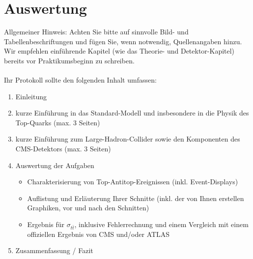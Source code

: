 \section{Auswertung}
\label{prot}
Allgemeiner Hinweis: Achten Sie bitte auf sinnvolle Bild- und Tabellenbeschriftungen und f\"ugen Sie, wenn notwendig, Quellenangaben hinzu. Wir empfehlen einf\"uhrende Kapitel (wie das Theorie- und Detektor-Kapitel) bereits vor Praktikumsbeginn zu schreiben.\\
\\
Ihr Protokoll sollte den folgenden Inhalt umfassen:
\begin{enumerate}
	\item Einleitung
	\item kurze Einf\"uhrung in das Standard-Modell und insbesondere in die Physik des Top-Quarks (max. 3 Seiten)
	\item kurze Einf\"uhrung zum Large-Hadron-Collider sowie den Komponenten des CMS-Detektors (max. 3 Seiten)
	\item Auswertung der Aufgaben
	\begin{itemize}
		\item Charakterisierung von Top-Antitop-Ereignissen (inkl. Event-Displays)
		\item Auflistung und Erl\"auterung Ihrer Schnitte (inkl. der von Ihnen erstellen Graphiken, vor und nach den Schnitten)
		\item Ergebnis f\"ur $\sigma_{t\bar{t}}$, inklusive Fehlerrechnung und einem Vergleich mit einem offiziellen Ergebnis von CMS und/oder ATLAS
	\end{itemize}
	\item Zusammenfassung / Fazit
\end{enumerate}